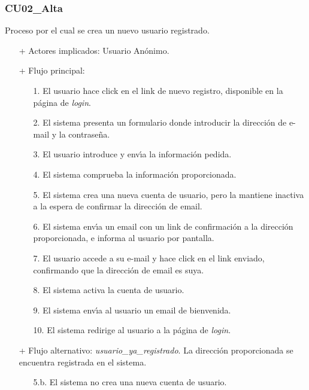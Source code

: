 \documentclass[a4paper]{report}
\begin{document}
            \subsubsection{CU02\_Alta}
                Proceso por el cual se crea un nuevo usuario registrado.
                \begin{itemize}
                    \item[+] Actores implicados: Usuario An\'onimo.
                    \item[+] Flujo principal:
                    \begin{enumerate}
                        \item[1.] El usuario hace click en el link de nuevo registro, disponible en la p\'agina de \emph{login}.
                        \item[2.] El sistema presenta un formulario donde introducir la direcci\'on de e-mail y la contrase\~na.
                        \item[3.] El usuario introduce y env\'\i{}a la informaci\'on pedida.
                        \item[4.] El sistema comprueba la informaci\'on proporcionada.
                        \item[5.] El sistema crea una nueva cuenta de usuario, pero la mantiene inactiva a la espera de confirmar la direcci\'on de email.
                        \item[6.] El sistema env\'\i{}a un email con un link de confirmaci\'on a la direcci\'on proporcionada, e informa al usuario por pantalla.
                        \item[7.] El usuario accede a su e-mail y hace click en el link enviado, confirmando que la direcci\'on de email es suya.
                        \item[8.] El sistema activa la cuenta de usuario.
                        \item[9.] El sistema env\'\i{}a al usuario un email de bienvenida.
                        \item[10.] El sistema redirige al usuario a la p\'agina de \emph{login}.
                    \end{enumerate}
                    \item[+] Flujo alternativo: \emph{usuario\_ya\_registrado}. La direcci\'on proporcionada se encuentra registrada en el sistema.
                    \begin{itemize}
                        \item[5.b.] El sistema no crea una nueva cuenta de usuario.

\end{itemize}
\end{itemize}
\end{document}
